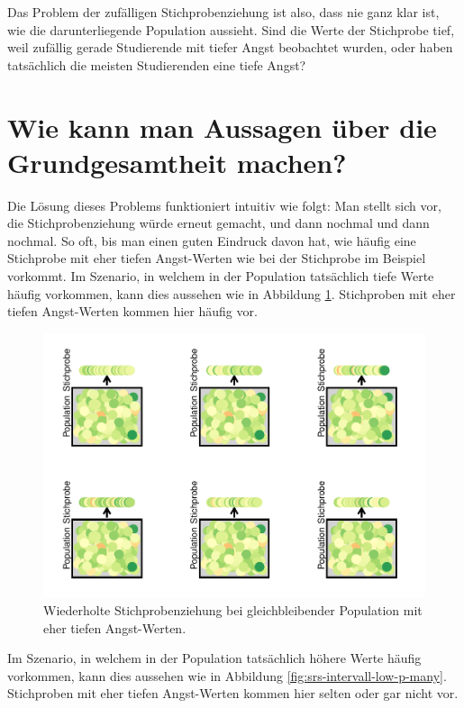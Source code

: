\documentclass[
]{book}
\theoremstyle{definition}
\theoremstyle{definition}
\theoremstyle{definition}
\theoremstyle{definition}
\theoremstyle{remark}
\begin{document}
Das Problem der zufälligen Stichprobenziehung ist also, dass nie ganz klar ist, wie die darunterliegende Population aussieht. Sind die Werte der Stichprobe tief, weil zufällig gerade Studierende mit tiefer Angst beobachtet wurden, oder haben tatsächlich die meisten Studierenden eine tiefe Angst?

\section{Wie kann man Aussagen über die Grundgesamtheit machen?}\label{stichprobenziehung-loesung}

Die Lösung dieses Problems funktioniert intuitiv wie folgt: Man stellt sich vor, die Stichprobenziehung würde erneut gemacht, und dann nochmal und dann nochmal. So oft, bis man einen guten Eindruck davon hat, wie häufig eine Stichprobe mit eher tiefen Angst-Werten wie bei der Stichprobe im Beispiel vorkommt. Im Szenario, in welchem in der Population tatsächlich tiefe Werte häufig vorkommen, kann dies aussehen wie in Abbildung \ref{fig:srs-intervall-high-p-many}. Stichproben mit eher tiefen Angst-Werten kommen hier häufig vor.

\begin{figure}
\centering
\includegraphics{aps_statistik1_files/figure-latex/srs-intervall-high-p-many-1.pdf}
\caption{\label{fig:srs-intervall-high-p-many}Wiederholte Stichprobenziehung bei gleichbleibender Population mit eher tiefen Angst-Werten.}
\end{figure}

Im Szenario, in welchem in der Population tatsächlich höhere Werte häufig vorkommen, kann dies aussehen wie in Abbildung \ref{fig:srs-intervall-low-p-many}. Stichproben mit eher tiefen Angst-Werten kommen hier selten oder gar nicht vor.
\end{document}
